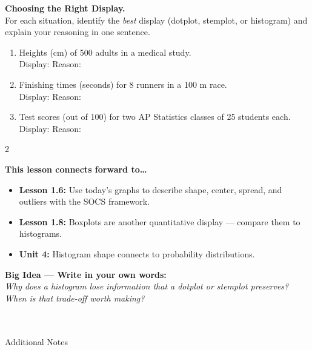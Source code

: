 \documentclass[10pt]{article}
\begin{document}
\begin{practicebox}
\small
\textbf{Choosing the Right Display.}\\[4pt]
For each situation, identify the \textit{best} display (dotplot, stemplot, or
histogram) and explain your reasoning in one sentence.

\vspace{8pt}
\begin{enumerate}[leftmargin=1.5em, itemsep=8pt]
  \item Heights (cm) of 500 adults in a medical study.\\
        Display: \blank{2.5cm} \quad Reason: \blank{7cm}

  \item Finishing times (seconds) for 8 runners in a 100 m race.\\
        Display: \blank{2.5cm} \quad Reason: \blank{7cm}

  \item Test scores (out of 100) for two AP Statistics classes of 25 students each.\\
        Display: \blank{2.5cm} \quad Reason: \blank{7cm}
\end{enumerate}
\end{practicebox}

\vspace{0.1in}

\begin{spiralbox}
\small
\begin{multicols}{2}

\textbf{This lesson connects forward to\dots}
\begin{itemize}[itemsep=2pt]
  \item \textbf{Lesson 1.6:} Use today's graphs to describe shape, center, spread,
        and outliers with the SOCS framework.
  \item \textbf{Lesson 1.8:} Boxplots are another quantitative display --- compare
        them to histograms.
  \item \textbf{Unit 4:} Histogram shape connects to probability distributions.
\end{itemize}

\columnbreak

\textbf{Big Idea --- Write in your own words:}\\
\textit{Why does a histogram lose information that a dotplot or stemplot preserves?
When is that trade-off worth making?}\\[2pt]
\writeline\\[1pt]\writeline\\[1pt]\writeline

\end{multicols}
\end{spiralbox}

\vspace{0.1in}

\begin{notesbox}{Additional Notes}
\vspace{0pt}
\writeline\\\writeline\\\writeline\\\writeline\\\writeline\\\writeline
\end{notesbox}
\end{document}
